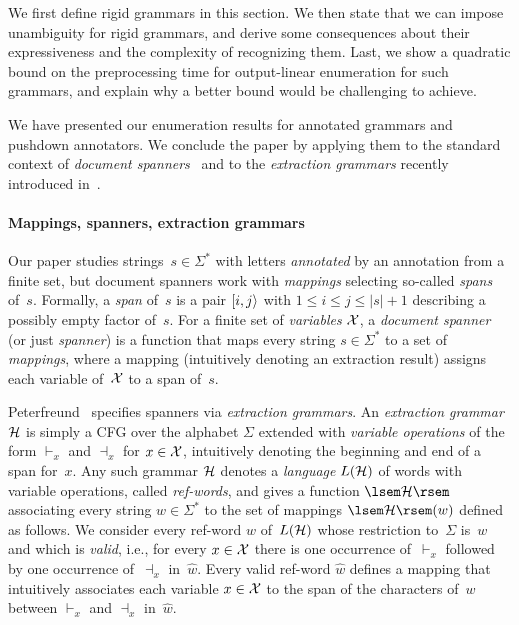 We first define rigid grammars in this section. We then state that we can impose
unambiguity for rigid grammars, and derive some consequences about their
expressiveness and the complexity of recognizing
them. Last, we show a quadratic bound on the
preprocessing time for output-linear enumeration for such grammars, and explain
why a better bound would be challenging to achieve.

%
%
%
%
%
%


%
%

%
%

We have presented our enumeration results for annotated grammars and
pushdown annotators. We conclude the paper by applying them to the
standard context of \emph{document spanners}~\cite{FaginKRV15} and to the
\emph{extraction grammars} recently introduced in~\cite{Peterfreund21}.

\paragraph{Mappings, spanners, extraction grammars}
Our paper studies strings~$s \in \Sigma^*$ with letters
\emph{annotated} by an annotation from a finite set, but document spanners work
with \emph{mappings} selecting so-called \emph{spans} of~$s$. Formally, 
%
a \emph{span} of~$s$ is a pair 
%
$[i,j\rangle$ with $1 \leq i \leq j \leq |s|+1$ describing a
possibly empty factor of~$s$.
For a finite set of \emph{variables} $\mathcal{X}$,
%
a \emph{document spanner} (or just \emph{spanner}) is a
function that maps every string $s \in \Sigma^*$ to a set of \emph{mappings},
where a mapping (intuitively denoting an extraction result)
assigns each variable of~$\mathcal{X}$ to a span of~$s$.

\newcommand{\splain}{\textsf{plain}}
Peterfreund~\cite{Peterfreund21} specifies spanners via \emph{extraction
grammars}. An \emph{extraction grammar} $\mathcal{H}$ is simply a
CFG over the alphabet $\Sigma$ extended with \emph{variable operations} of the form
$\vdash_x$ and $\dashv_x$ for $x \in \mathcal{X}$, intuitively denoting the beginning and end of a
span for~$x$. Any such grammar $\mathcal{H}$ denotes a \emph{language} $L(\mathcal{H})$ of words with
variable operations, called \emph{ref-words}, and gives a function
$\sem{\cH}$ associating every string $w \in \Sigma^*$ to the set of
mappings $\sem{\cH}(w)$ defined as follows. We consider every ref-word $\hat{w}$ of~$L(\mathcal{H})$ whose restriction to~$\Sigma$
is~$w$ and which is \emph{valid}, i.e., 
%
for every $x \in \mathcal{X}$ there is one occurrence of~$\vdash_x$ followed by
one occurrence of~$\dashv_x$ in~$\hat{w}$. Every valid ref-word
$\hat{w}$ defines a mapping that intuitively associates each variable $x \in
\mathcal{X}$ to the span of the characters of~$w$ between 
$\vdash_x$ and $\dashv_x$ in~$\hat{w}$.

